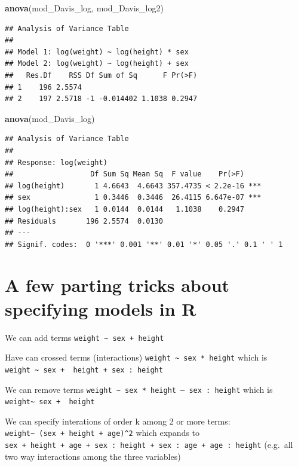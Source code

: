 \documentclass[
]{book}
\newenvironment{Shaded}{\begin{snugshade}}{\end{snugshade}}
\newcommand{\FunctionTok}[1]{\textcolor[rgb]{0.13,0.29,0.53}{\textbf{#1}}}
\newcommand{\NormalTok}[1]{#1}
\begin{document}
\begin{Shaded}
\begin{Highlighting}[]
\FunctionTok{anova}\NormalTok{(mod\_Davis\_log, mod\_Davis\_log2)}
\end{Highlighting}
\end{Shaded}

\begin{verbatim}
## Analysis of Variance Table
## 
## Model 1: log(weight) ~ log(height) * sex
## Model 2: log(weight) ~ log(height) + sex
##   Res.Df    RSS Df Sum of Sq      F Pr(>F)
## 1    196 2.5574                           
## 2    197 2.5718 -1 -0.014402 1.1038 0.2947
\end{verbatim}

\begin{Shaded}
\begin{Highlighting}[]
\FunctionTok{anova}\NormalTok{(mod\_Davis\_log)}
\end{Highlighting}
\end{Shaded}

\begin{verbatim}
## Analysis of Variance Table
## 
## Response: log(weight)
##                  Df Sum Sq Mean Sq  F value    Pr(>F)    
## log(height)       1 4.6643  4.6643 357.4735 < 2.2e-16 ***
## sex               1 0.3446  0.3446  26.4115 6.647e-07 ***
## log(height):sex   1 0.0144  0.0144   1.1038    0.2947    
## Residuals       196 2.5574  0.0130                       
## ---
## Signif. codes:  0 '***' 0.001 '**' 0.01 '*' 0.05 '.' 0.1 ' ' 1
\end{verbatim}

\hypertarget{a-few-parting-tricks-about-specifying-models-in-r}{%
\section{A few parting tricks about specifying models in R}\label{a-few-parting-tricks-about-specifying-models-in-r}}

We can add terms
\texttt{weight\ \textasciitilde{}\ sex\ +\ height}

Have can crossed terms (interactions)
\texttt{weight\ \textasciitilde{}\ sex\ *\ height} which is \texttt{weight\ \textasciitilde{}\ sex\ +\ \ height\ +\ sex\ :\ height}

We can remove terms
\texttt{weight\ \textasciitilde{}\ sex\ *\ height\ –\ sex\ :\ height} which is \texttt{weight\textasciitilde{}\ sex\ +\ \ height}

We can specify interations of order k among 2 or more terms:
\texttt{weight\textasciitilde{}\ (sex\ +\ height\ +\ age)\^{}2} which expands to \texttt{sex\ +\ height\ +\ age\ +\ sex\ :\ height\ +\ sex\ :\ age\ +\ age\ :\ height} (e.g.~all two way interactions among the three variables)
\end{document}

